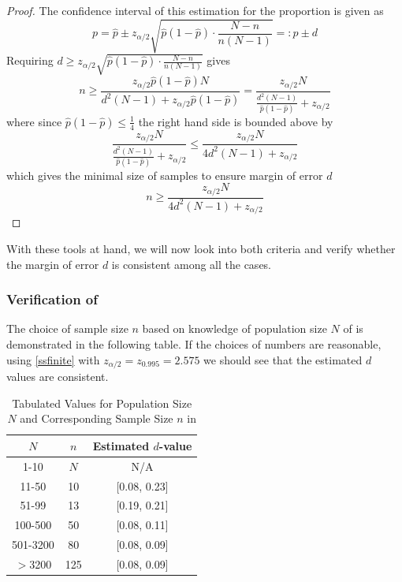 \documentclass[12pt]{article}
\begin{document}
\begin{proof}
    The confidence interval of this estimation for the proportion is given as
    $$
    p = \hat{p}\pm z_{\alpha/2} \sqrt{\hat{p}(1-\hat{p})\cdot \dfrac{N-n}{n(N-1)}} =: \hat{p} \pm d
    $$
    Requiring $d\geq z_{\alpha/2} \sqrt{\hat{p}(1-\hat{p})\cdot \frac{N-n}{n(N-1)}}$ gives
    $$
    n\geq \dfrac{z_{\alpha/2}\hat{p}(1-\hat{p})N}{d^2(N-1)+z_{\alpha/2}\hat{p}(1-\hat{p})} = \dfrac{z_{\alpha/2}N}{\frac{d^2(N-1)}{\hat{p}(1-\hat{p})}+z_{\alpha/2}}
    $$
    where since $\hat{p}(1-\hat{p})\leq\frac{1}{4}$ the right hand side is bounded above by
    $$
    \dfrac{z_{\alpha/2}N}{\frac{d^2(N-1)}{\hat{p}(1-\hat{p})}+z_{\alpha/2}} \leq \dfrac{z_{\alpha/2}N}{4d^2(N-1)+z_{\alpha/2}}
    $$
    which gives the minimal size of samples to ensure margin of error $d$
    $$
    n\geq \dfrac{z_{\alpha/2}N}{4d^2(N-1)+z_{\alpha/2}}
    $$
\end{proof}

With these tools at hand, we will now look into both criteria and verify whether the margin of error $d$ is consistent among all the cases.

\subsubsection{Verification of \cite{JJF2005}}

The choice of sample size $n$ based on knowledge of population size $N$ of \cite{JJF2005} is demonstrated in the following table. If the choices of numbers are reasonable, using \eqref{ssfinite} with $z_{\alpha/2} = z_{0.995} = 2.575$ we should see that the estimated $d$ values are consistent. 

\begin{table}[htbp]
    \centering
    \begin{tabular}{ccc}
        \toprule
        $N$ & $n$ & Estimated $d$-value \\
        \midrule
        1-10 & $N$ & N/A \\
        11-50 & 10 & [0.08, 0.23] \\
        51-99 & 13 & [0.19, 0.21] \\
        100-500 & 50 & [0.08, 0.11]\\ 
        501-3200 & 80 & [0.08, 0.09]\\
        $>$3200 & 125 & [0.08, 0.09] \\
        \bottomrule
    \end{tabular}
    \caption{Tabulated Values for Population Size $N$ and Corresponding Sample Size $n$ in \cite{JJF2005}}
\end{table}
\end{document}
